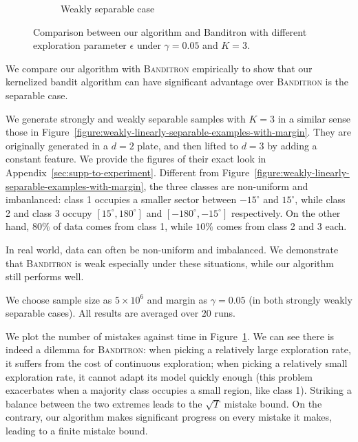 \begin{figure}
\begin{subfigure}[b]{0.23\textwidth}
        \caption{Weakly separable case}
    \end{subfigure}
    \vspace*{-0.2cm}
    \caption{Comparison between our algorithm and Banditron with different exploration parameter $\epsilon$ under $\gamma=0.05$ and $K=3$. }
    \label{fig:both}
\end{figure}

We compare our algorithm with \textsc{Banditron} empirically to show that our kernelized bandit algorithm can have significant advantage over \textsc{Banditron} is the separable case. 

We generate strongly and weakly separable samples with $K=3$ in a similar sense those in Figure~\ref{figure:weakly-linearly-separable-examples-with-margin}. They are originally generated in a $d=2$ plate, and then lifted to $d=3$ by adding a constant feature. We provide the figures of their exact look in Appendix~\ref{sec:supp-to-experiment}. Different from Figure~\ref{figure:weakly-linearly-separable-examples-with-margin}, the three classes are non-uniform and imbanlanced: class 1 occupies a smaller sector between $-15^\circ$ and $15^\circ$, while class 2 and class 3 occupy $[15^\circ, 180^\circ]$ and $[-180^\circ, -15^\circ]$ respectively. On the other hand, $80\%$ of data comes from class 1, while $10\%$ comes from class 2 and 3 each. 

In real world, data can often be non-uniform and imbalanced. We demonstrate that \textsc{Banditron} is weak especially under these situations, while our algorithm still performs well.

We choose sample size as $5\times 10^6$ and margin as $\gamma=0.05$ (in both strongly weakly separable cases). All results are averaged over $20$ runs. 

We plot the number of mistakes against time in Figure~\ref{fig:both}. We can see there is indeed a dilemma for \textsc{Banditron}: when picking a relatively large exploration rate, it suffers from the cost of continuous exploration; when picking a relatively small exploration rate, it cannot adapt its model quickly enough (this problem exacerbates when a majority class occupies a small region, like class 1). Striking a balance between the two extremes leads to the $\sqrt{T}$ mistake bound. On the contrary, our algorithm makes significant progress on every mistake it makes, leading to a finite mistake bound.  